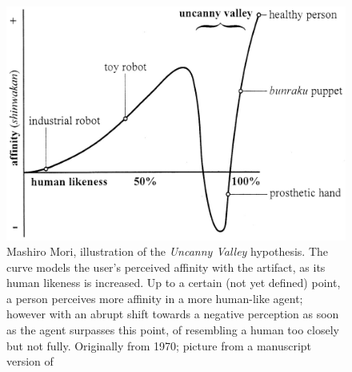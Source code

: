 \documentclass{frontiersSCNS} %
\begin{document}
\begin{figure}\centering
  \includegraphics[scale=0.75]{uncanny-valley.jpg}
 \caption{Mashiro Mori, illustration of the \textit{Uncanny Valley} hypothesis. The curve models the user's perceived affinity with the artifact, as its human likeness is increased. Up to a certain (not yet defined) point, a person perceives more affinity in a more human-like agent; however with an abrupt shift towards a negative perception as soon as the agent surpasses this point, of resembling a human too closely but not fully. Originally from 1970; picture from a manuscript version of \cite{mori_uncanny_2012}}
 \label{fig:uncanny_valley}       %
 \end{figure}
\end{document}
